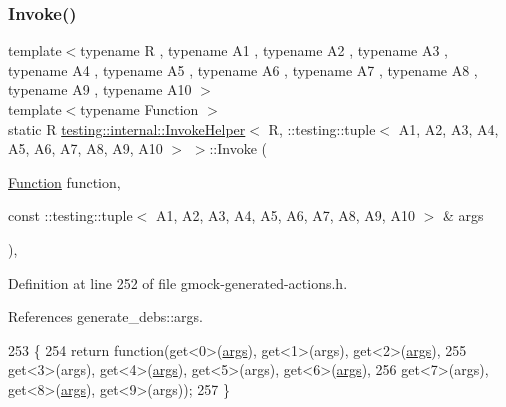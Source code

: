 \subsubsection{\texorpdfstring{Invoke()}{Invoke()}}
{\footnotesize\ttfamily template$<$typename R , typename A1 , typename A2 , typename A3 , typename A4 , typename A5 , typename A6 , typename A7 , typename A8 , typename A9 , typename A10 $>$ \\
template$<$typename Function $>$ \\
static R \hyperlink{classtesting_1_1internal_1_1InvokeHelper}{testing\+::internal\+::\+Invoke\+Helper}$<$ R, \+::testing\+::tuple$<$ A1, A2, A3, A4, A5, A6, A7, A8, A9, A10 $>$ $>$\+::Invoke (\begin{DoxyParamCaption}\item[{\hyperlink{structtesting_1_1internal_1_1Function}{Function}}]{function,  }\item[{const \+::testing\+::tuple$<$ A1, A2, A3, A4, A5, A6, A7, A8, A9, A10 $>$ \&}]{args }\end{DoxyParamCaption})\hspace{0.3cm}{\ttfamily [inline]}, {\ttfamily [static]}}



Definition at line 252 of file gmock-\/generated-\/actions.\+h.



References generate\+\_\+debs\+::args.


\begin{DoxyCode}
253                                   \{
254            \textcolor{keywordflow}{return} \textcolor{keyword}{function}(get<0>(\hyperlink{namespacegenerate__debs_a75f9143e38df82d83b2e8a6f99cae02c}{args}), get<1>(args), get<2>(\hyperlink{namespacegenerate__debs_a75f9143e38df82d83b2e8a6f99cae02c}{args}),
255                get<3>(args), get<4>(\hyperlink{namespacegenerate__debs_a75f9143e38df82d83b2e8a6f99cae02c}{args}), get<5>(args), get<6>(\hyperlink{namespacegenerate__debs_a75f9143e38df82d83b2e8a6f99cae02c}{args}),
256                get<7>(args), get<8>(\hyperlink{namespacegenerate__debs_a75f9143e38df82d83b2e8a6f99cae02c}{args}), get<9>(args));
257   \}
\end{DoxyCode}
\mbox{\label{classtesting_1_1internal_1_1InvokeHelper_3_01R_00_01_1_1testing_1_1tuple_3_01A1_00_01A2_00_01A3_9a04af5e172e051ec3c8faaa2f50b42f_abb3ca4e2a681361685aca2b508fa13b8}} 
